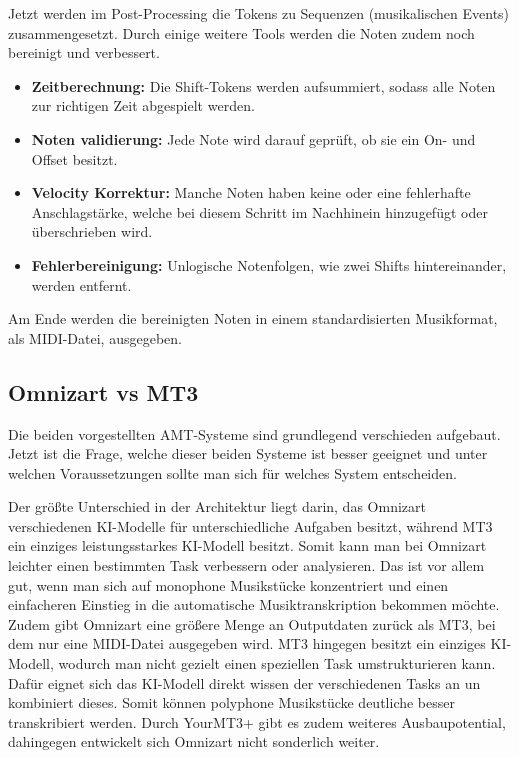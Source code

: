 Jetzt werden im Post-Processing die Tokens zu Sequenzen (musikalischen Events) zusammengesetzt.
Durch einige weitere Tools werden die Noten zudem noch bereinigt und verbessert.
\begin{itemize}
  \item \textbf{Zeitberechnung:} Die Shift-Tokens werden aufsummiert, sodass alle Noten zur richtigen Zeit abgespielt werden.
  \item \textbf{Noten validierung:} Jede Note wird darauf geprüft, ob sie ein On- und Offset besitzt.
  \item \textbf{Velocity Korrektur:} Manche Noten haben keine oder eine fehlerhafte Anschlagstärke, welche bei diesem Schritt im Nachhinein hinzugefügt oder überschrieben wird.
  \item \textbf{Fehlerbereinigung:} Unlogische Notenfolgen, wie zwei Shifts hintereinander, werden entfernt.
\end{itemize}
Am Ende werden die bereinigten Noten in einem standardisierten Musikformat, als MIDI-Datei, ausgegeben.

\subsection{Omnizart vs MT3}
Die beiden vorgestellten AMT-Systeme sind grundlegend verschieden aufgebaut.
Jetzt ist die Frage, welche dieser beiden Systeme ist besser geeignet
und unter welchen Voraussetzungen sollte man sich für welches System entscheiden.

Der größte Unterschied in der Architektur liegt darin,
das Omnizart verschiedenen KI-Modelle für unterschiedliche Aufgaben besitzt,
während MT3 ein einziges leistungsstarkes KI-Modell besitzt.
Somit kann man bei Omnizart leichter einen bestimmten Task verbessern oder analysieren.
Das ist vor allem gut, wenn man sich auf monophone Musikstücke konzentriert
und einen einfacheren Einstieg in die automatische Musiktranskription bekommen möchte.
Zudem gibt Omnizart eine größere Menge an Outputdaten zurück als MT3, bei dem nur eine MIDI-Datei ausgegeben wird.
MT3 hingegen besitzt ein einziges KI-Modell, wodurch man nicht gezielt einen speziellen Task umstrukturieren kann.
Dafür eignet sich das KI-Modell direkt wissen der verschiedenen Tasks an un kombiniert dieses.
Somit können polyphone Musikstücke deutliche besser transkribiert werden.
Durch YourMT3+ gibt es zudem weiteres Ausbaupotential, dahingegen entwickelt sich Omnizart nicht sonderlich weiter.

